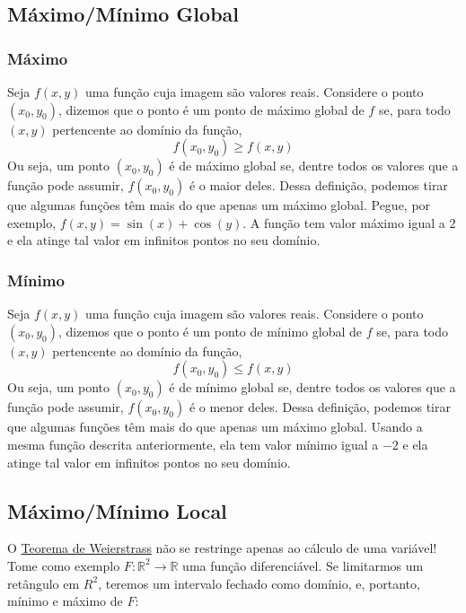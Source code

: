 \documentclass[
  portuguese,
  letterpaper,
  DIV=11,
  numbers=noendperiod]{scrreport}
\begin{document}
\subsection{Máximo/Mínimo Global}\label{muxe1ximomuxednimo-global}

\subsubsection{Máximo}\label{muxe1ximo}

Seja \(f(x,y)\) uma função cuja imagem são valores reais. Considere o
ponto \((x_0, y_0)\), dizemos que o ponto é um ponto de máximo global de
\(f\) se, para todo \((x,y)\) pertencente ao domínio da função, \[
f(x_0, y_0) \geq f(x,y)
\] Ou seja, um ponto \((x_0, y_0)\) é de máximo global se, dentre todos
os valores que a função pode assumir, \(f(x_0, y_0)\) é o maior deles.
Dessa definição, podemos tirar que algumas funções têm mais do que
apenas um máximo global. Pegue, por exemplo,
\(f(x,y)= \sin(x) + \cos(y)\). A função tem valor máximo igual a \(2\) e
ela atinge tal valor em infinitos pontos no seu domínio.

\subsubsection{Mínimo}\label{muxednimo}

Seja \(f(x,y)\) uma função cuja imagem são valores reais. Considere o
ponto \((x_0, y_0)\), dizemos que o ponto é um ponto de mínimo global de
\(f\) se, para todo \((x,y)\) pertencente ao domínio da função, \[
f(x_0, y_0) \leq f(x,y)
\] Ou seja, um ponto \((x_0, y_0)\) é de mínimo global se, dentre todos
os valores que a função pode assumir, \(f(x_0, y_0)\) é o menor deles.
Dessa definição, podemos tirar que algumas funções têm mais do que
apenas um máximo global. Usando a mesma função descrita anteriormente,
ela tem valor mínimo igual a \(-2\) e ela atinge tal valor em infinitos
pontos no seu domínio.

\subsection{Máximo/Mínimo Local}\label{muxe1ximomuxednimo-local}

O \hyperref[sec-weierstrass]{Teorema de Weierstrass} não se restringe
apenas ao cálculo de uma variável! Tome como exemplo
\(F: \mathbb{R}^2 \rightarrow \mathbb{R}\) uma função diferenciável. Se
limitarmos um retângulo em \(R^2\), teremos um intervalo fechado como
domínio, e, portanto, mínimo e máximo de \(F\):
\end{document}

